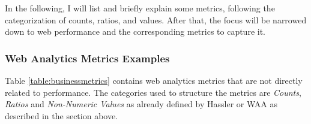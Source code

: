 In the following, I will list and briefly explain some metrics, following the categorization of counts, ratios, and values.
After that, the focus will be narrowed down to web performance and the corresponding metrics to capture it.




\subsubsection{Web Analytics Metrics Examples} %
\label{subsubsection:web_analytics_metrics_examples}

Table \ref{table:businessmetrics} contains web analytics metrics that are not directly related to performance.
The categories used to structure the metrics are \textit{Counts}, \textit{Ratios} and \textit{Non-Numeric Values} as already defined by Hassler or WAA as described in the section above.






